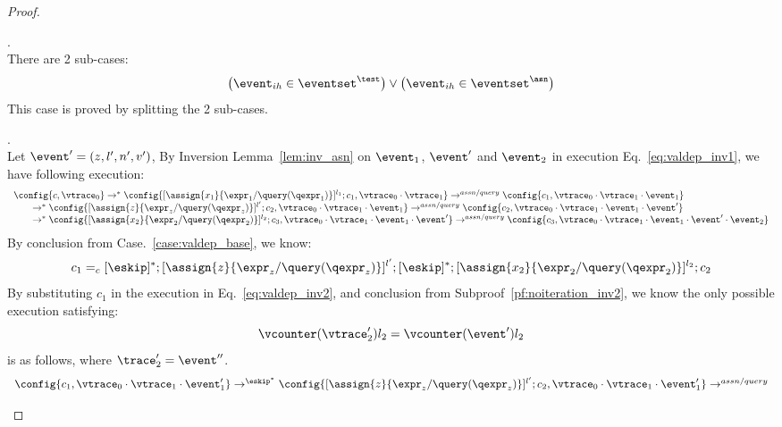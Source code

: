 {\begin{proof}
%
\begin{case}[$\trace_2 = \trace_{ih} \cdot \event_{ih}$]
\label{case:valdep_ih}.
\\
%
There are 2 sub-cases: 
%
 \[
 \big(\event_{ih} \in \eventset^{\test}\big) \lor \big(\event_{ih} \in \eventset^{\asn}\big)
 \]
%
This case is proved by splitting the 2 sub-cases.
%
\begin{subcase}.
\label{case:valdep_ihasn}
%
\\
Let $\event' = (z, l', n', v')$, 
%
By Inversion Lemma~\ref{lem:inv_asn} on $\event_1$, $\event'$ and $\event_2$ in execution Eq.~\ref{eq:valdep_inv1}, we have following execution:
\begin{equation}
\label{eq:m1asn_inv1}
  \begin{array}{l}   
\config{{c}, \vtrace_0} \rightarrow^{*} 
\config{[\assign{{x}_1}{\expr_1 / \query(\qexpr_1)}]^{l_1} ; {c}_1, \vtrace_0 \cdot \vtrace_1}  \rightarrow^{assn/query}
 \config{c_1, \vtrace_0 \cdot \vtrace_1 \cdot \event_1} \\
  \qquad \rightarrow^{*} 
  \config{[\assign{z}{\expr_z / \query(\qexpr_z)}]^{l'};{c}_2, 
  \vtrace_0 \cdot \vtrace_1 \cdot \event_1} 
  \rightarrow^{assn/query} 
  \config{{c}_2,  \vtrace_0 \cdot \vtrace_1 \cdot \event_1 \cdot \event'}  \\
  \qquad \rightarrow^{*} 
  \config{[\assign{{x}_2}{\expr_2 / \query(\qexpr_2)}]^{l_2};{c}_3, 
  \vtrace_0 \cdot \vtrace_1 \cdot \event_1\cdot \event'} 
  \rightarrow^{assn/query} 
  \config{{c}_3,  \vtrace_0 \cdot \vtrace_1 \cdot \event_1 \cdot \event' \cdot \event_2} 
\end{array}
 \end{equation}
By conclusion from Case.~\ref{case:valdep_base}, we know:
 \[
 c_1 =_c 
 [\eskip]{}^*;[\assign{z}{\expr_z / \query(\qexpr_z)}]^{l'};  [\eskip]{}^*; [\assign{{x}_2}{\expr_2 / \query(\qexpr_2)}]^{l_2};{c}_2
 \]
 By substituting $c_1$ in the execution in Eq.~\ref{eq:valdep_inv2}, and conclusion from Subproof~\ref{pf:noiteration_inv2}, we know the only possible execution satisfying:
 \[
  \vcounter(\vtrace_2') l_2 = \vcounter(\event') l_2
\]
%
 is as follows, where $\trace_2' = \event''$.
\begin{equation}
\label{eq:m1asn_inv2}
  \begin{array}{l}   
  \config{c_1, \vtrace_0 \cdot \vtrace_1 \cdot \event_1'} 
  \rightarrow^{\eskip^*} 
  \config{[\assign{z}{\expr_z / \query(\qexpr_z)}]^{l'};{c}_2, 
  \vtrace_0 \cdot \vtrace_1 \cdot \event_1'} 
  \rightarrow^{assn/query} 

\end{array}
\end{equation}
\end{subcase}
\end{case}
\end{proof}}
